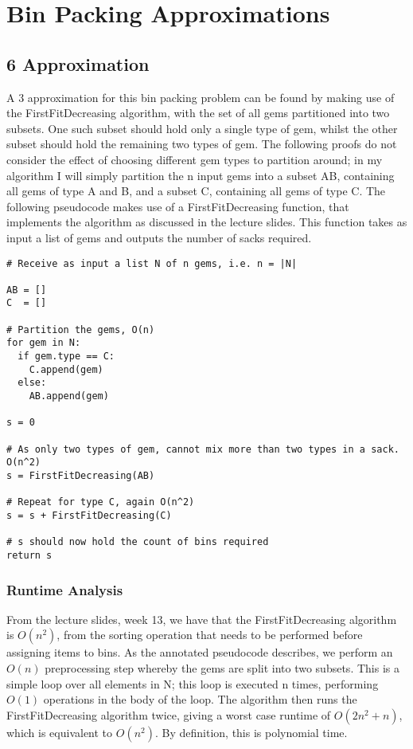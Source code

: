 \documentclass[paper=a4, fontsize=12pt]{article}
\begin{document}
\section{Bin Packing Approximations}

\subsection{6 Approximation}

A 3 approximation for this bin packing problem can be found by making use of
the FirstFitDecreasing algorithm, with the set of all gems partitioned into two
subsets. One such subset should hold only a single type of gem, whilst the
other subset should hold the remaining two types of gem. The following proofs
do not consider the effect of choosing different gem types to partition around;
in my algorithm I will simply partition the n input gems into a subset AB,
containing all gems of type A and B, and a subset C, containing all gems of
type C. The following pseudocode makes use of a FirstFitDecreasing function,
that implements the algorithm as discussed in the lecture slides. This function
takes as input a list of gems and outputs the number of sacks required.

\begin{lstlisting}
# Receive as input a list N of n gems, i.e. n = |N|

AB = []
C  = []

# Partition the gems, O(n)
for gem in N:
  if gem.type == C:
    C.append(gem)
  else:
    AB.append(gem)

s = 0

# As only two types of gem, cannot mix more than two types in a sack. O(n^2)
s = FirstFitDecreasing(AB)

# Repeat for type C, again O(n^2)
s = s + FirstFitDecreasing(C)

# s should now hold the count of bins required
return s
\end{lstlisting}

\subsubsection{Runtime Analysis}
From the lecture slides, week 13, we have that the FirstFitDecreasing algorithm
is \(O(n^2)\), from the sorting operation that needs to be performed before
assigning items to bins. As the annotated pseudocode describes, we perform an
\(O(n)\) preprocessing step whereby the gems are split into two subsets. This
is a simple loop over all elements in N; this loop is executed n times,
performing \(O(1)\) operations in the body of the loop. The algorithm then runs
the FirstFitDecreasing algorithm twice, giving a worst case runtime of \(O(2n^2
+ n)\), which is equivalent to \(O(n^2)\). By definition, this is polynomial
time.
\end{document}
